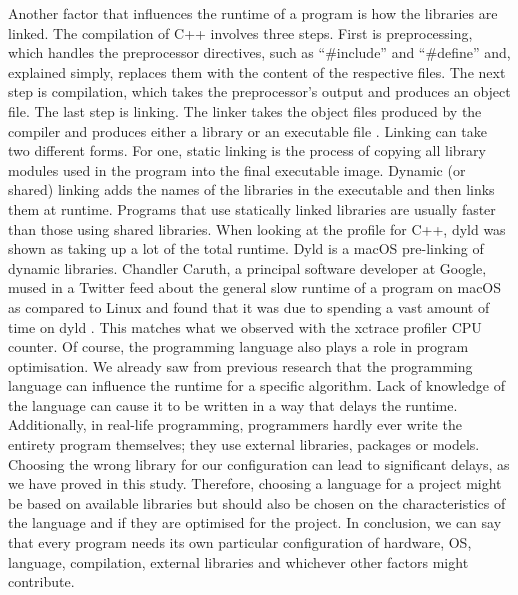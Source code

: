 Another factor that influences the runtime of a program is how the libraries are linked. The compilation of C++ involves three steps. First is preprocessing, which handles the preprocessor directives, such as “\#include” and “\#define” and, explained simply, replaces them with the content of the respective files. The next step is compilation, which takes the preprocessor’s output and produces an object file. The last step is linking. The linker takes the object files produced by the compiler and produces either a library or an executable file \cite{linking}. Linking can take two different forms. For one, static linking is the process of copying all library modules used in the program into the final executable image. Dynamic (or shared) linking adds the names of the libraries in the executable and then links them at runtime. Programs that use statically linked libraries are usually faster than those using shared libraries. When looking at the profile for C++, dyld was shown as taking up a lot of the total runtime. Dyld is a macOS pre-linking of dynamic libraries. Chandler Caruth, a principal software developer at Google, mused in a Twitter feed about the general slow runtime of a program on macOS as compared to Linux and found that it was due to spending a vast amount of time on dyld \cite{twitter}. This matches what we observed with the xctrace profiler CPU counter.
Of course, the programming language also plays a role in program optimisation. We already saw from previous research that the programming language can influence the runtime for a specific algorithm. Lack of knowledge of the language can cause it to be written in a way that delays the runtime. Additionally, in real-life programming, programmers hardly ever write the entirety program themselves; they use external libraries, packages or models. Choosing the wrong library for our configuration can lead to significant delays, as we have proved in this study. Therefore, choosing a language for a project might be based on available libraries but should also be chosen on the characteristics of the language and if they are optimised for the project. In conclusion, we can say that every program needs its own particular configuration of hardware, OS, language, compilation, external libraries and whichever other factors might contribute.
